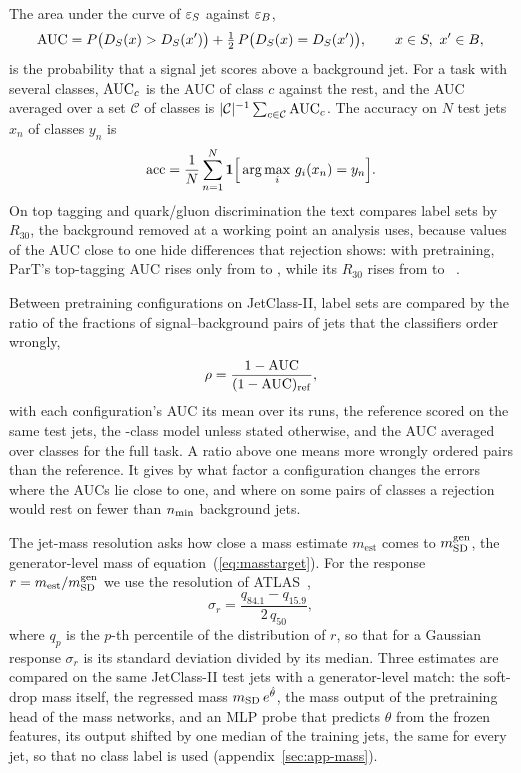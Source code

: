 The area under the curve of $\varepsilon_S$ against $\varepsilon_B$,
\begin{equation}\label{eq:auc}
  \mathrm{AUC} = P\bigl(D_S(x) > D_S(x')\bigr) + \tfrac{1}{2}\,P\bigl(D_S(x) = D_S(x')\bigr) , \qquad x\in S,\ x'\in B ,
\end{equation}
is the probability that a signal jet scores above a background jet. For a task with several classes,
$\mathrm{AUC}_c$ is the AUC of class $c$ against the rest, and the AUC averaged over a set $\mathcal{C}$ of classes is
$|\mathcal{C}|^{-1}\sum_{c\in\mathcal{C}}\mathrm{AUC}_c$. The accuracy on $N$ test jets $x_n$ of classes $y_n$ is
\begin{equation}\label{eq:acc}
  \mathrm{acc} = \frac{1}{N}\sum_{n=1}^{N} \mathbf{1}\Bigl[\,\arg\max_i\, g_i(x_n) = y_n\Bigr] .
\end{equation}
On top tagging and quark/gluon discrimination the text compares label sets by $R_{30}$, the background removed
at a working point an analysis uses, because values of the AUC close to one hide differences that rejection
shows: with pretraining, ParT's top-tagging AUC rises only from \LitPartTopAucScratch{} to \LitPartTopAucFt, while
its $R_{30}$ rises from \LitPartTopRejScratch{} to \LitPartTopRejFt~\cite{part}.

Between pretraining configurations on JetClass-II, label sets are compared by the ratio of the fractions of
signal--background pairs of jets that the classifiers order wrongly,
\begin{equation}\label{eq:ratio}
  \rho = \frac{1-\mathrm{AUC}}{(1-\mathrm{AUC})_{\mathrm{ref}}} ,
\end{equation}
with each configuration's AUC its mean over its runs, the reference scored on the same test jets, the
\Kfull-class model unless stated otherwise, and the AUC averaged over classes for the full task. A ratio above one means more wrongly ordered pairs than the
reference. It gives by what factor a configuration changes the errors where the AUCs lie close to one, and
where on some pairs of classes a rejection would rest on fewer than $n_{\min}$ background jets.

The jet-mass resolution asks how close a mass estimate $m_{\mathrm{est}}$ comes to $m^{\mathrm{gen}}_{\mathrm{SD}}$, the generator-level
mass of equation~(\ref{eq:masstarget}). For the response $r = m_{\mathrm{est}}/m^{\mathrm{gen}}_{\mathrm{SD}}$ we use the resolution
of ATLAS~\cite[Sec.~6]{atlasregression},
\begin{equation}\label{eq:resolution}
  \sigma_r = \frac{q_{84.1} - q_{15.9}}{2\,q_{50}} ,
\end{equation}
where $q_p$ is the $p$-th percentile of the distribution of $r$, so that for a Gaussian response $\sigma_r$ is
its standard deviation divided by its median. Three estimates are compared on the same JetClass-II test jets
with a generator-level match: the soft-drop mass itself, the regressed mass $m_{\mathrm{SD}}\,e^{\hat\theta}$, the mass output of the
pretraining head of the mass networks, and an MLP probe that predicts $\theta$ from the frozen features, its output shifted by
one median of the training jets, the same for every jet, so that no class label is used
(appendix~\ref{sec:app-mass}).

